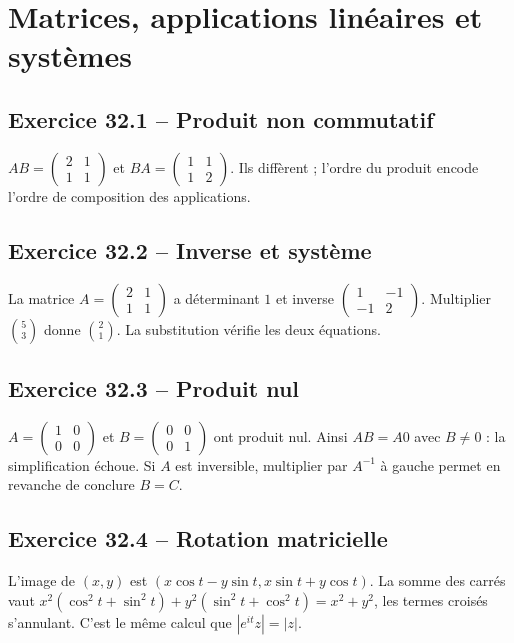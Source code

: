 \chapter{Matrices, applications linéaires et systèmes}
\section*{Exercice 32.1 -- Produit non commutatif}
$AB=\begin{pmatrix}2&1\\1&1\end{pmatrix}$ et $BA=\begin{pmatrix}1&1\\1&2\end{pmatrix}$. Ils diffèrent ; l'ordre du produit encode l'ordre de composition des applications.

\section*{Exercice 32.2 -- Inverse et système}
La matrice $A=\begin{pmatrix}2&1\\1&1\end{pmatrix}$ a déterminant $1$ et inverse $\begin{pmatrix}1&-1\\-1&2\end{pmatrix}$. Multiplier $\binom53$ donne $\binom21$. La substitution vérifie les deux équations.

\section*{Exercice 32.3 -- Produit nul}
$A=\begin{pmatrix}1&0\\0&0\end{pmatrix}$ et $B=\begin{pmatrix}0&0\\0&1\end{pmatrix}$ ont produit nul. Ainsi $AB=A0$ avec $B\ne0$ : la simplification échoue. Si $A$ est inversible, multiplier par $A^{-1}$ à gauche permet en revanche de conclure $B=C$.

\section*{Exercice 32.4 -- Rotation matricielle}
L'image de $(x,y)$ est $(x\cos t-y\sin t,x\sin t+y\cos t)$. La somme des carrés vaut $x^2(\cos^2t+\sin^2t)+y^2(\sin^2t+\cos^2t)=x^2+y^2$, les termes croisés s'annulant. C'est le même calcul que $|e^{i t}z|=|z|$.

